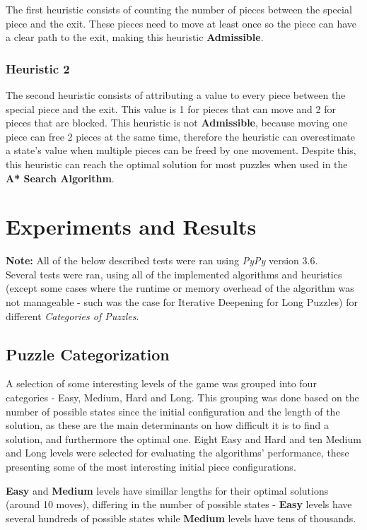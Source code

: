 \documentclass[conference]{IEEEtran}
\begin{document}
The first heuristic consists of counting the number of pieces between the special piece and the exit. These pieces need to move at least once so the piece can have a clear path to the exit, making this heuristic \textbf{Admissible}.

\subsubsection{Heuristic 2}

The second heuristic consists of attributing a value to every piece between the special piece and the exit. This value is 1 for pieces that can move and 2 for pieces that are blocked. This heuristic is not \textbf{Admissible}, because moving one piece can free 2 pieces at the same time, therefore the heuristic can overestimate a state's value when multiple pieces can be freed by one movement. Despite this, this heuristic can reach the optimal solution for most puzzles when used in the \textbf{A* Search Algorithm}.

\section{Experiments and Results}
\textbf{Note:} All of the below described tests were ran using \textit{PyPy} version 3.6.\\

Several tests were ran, using all of the implemented algorithms and heuristics (except some cases where the runtime or memory overhead of the algorithm was not manageable - such was the case for Iterative Deepening for Long Puzzles) for different \textit{Categories of Puzzles}.

\subsection{Puzzle Categorization}

A selection of some interesting levels of the game was grouped into four categories - Easy, Medium, Hard and Long. This grouping was done based on the number of possible states since the initial configuration and the length of the solution, as these are the main determinants on how difficult it is to find a solution, and furthermore the optimal one. Eight Easy and Hard and ten Medium and Long levels were selected for evaluating the algorithms' performance, these presenting some of the most interesting initial piece configurations.

\textbf{Easy} and \textbf{Medium} levels have simillar lengths for their optimal solutions (around 10 moves), differing in the number of possible states - \textbf{Easy} levels have several hundreds of possible states while \textbf{Medium} levels have tens of thousands.
\end{document}
